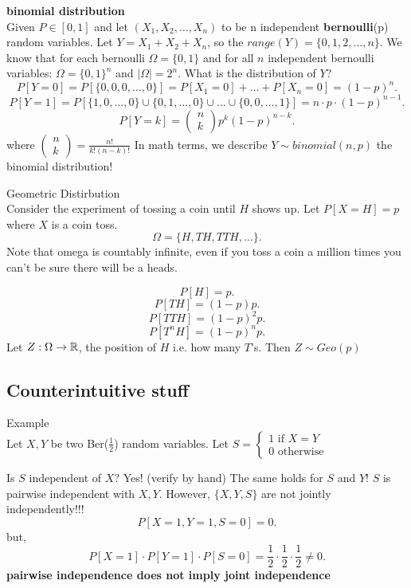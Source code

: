 \documentclass[a4paper]{article}
\begin{document}
\begin{definition}
  \textbf{binomial distribution}\\
  Given $P \in [0,1]$ and let  $\left( X_1,X_{2}, \ldots, X_{n} \right)$ to be n independent \textbf{bernoulli}(p)
  random variables. Let $Y = X_1 + X_2 + X_n$, so the $range(Y) = \{0,1,2,\ldots, n\}$. We know that for 
  each bernoulli $\Omega = \{0,1\} $ and for all $n$ independent bernoulli variables:  $\Omega = \{0,1\}^n$
  and $\mid \Omega \mid  = 2^n$. What is the distribution of $Y$?
   \[
     P[Y=0] = P[\{0,0,0,\ldots,0\}] = P[X_1 = 0] + \ldots + P[X_n = 0] = \left( 1-p \right)^n  
  .\] 
  \[
    P[Y=1] = P[\{1,0,\ldots,0\} \cup \{0,1,\ldots,0\} \cup \ldots \cup \{0,0,\ldots,1\}] = 
    n \cdot p \cdot (1-p)^{n-1}
  .\]
  \[
    P[Y=k] = \begin{pmatrix} n \\ k \end{pmatrix} p^k (1-p)^{n-k} 
  .\] 
  where $\begin{pmatrix} n \\ k \end{pmatrix} = \frac{n!}{k! (n-k)!}$ 
  In math terms, we describe $Y \sim binomial(n,p)$ the binomial distribution!
\end{definition}

\begin{definition}{Geometric Distirbution} \\
  Consider the experiment of tossing a coin until $H$ shows up. Let $P[X=H] = p$ where $X$ is a coin toss.
  \[
  \Omega = \{H, TH, TTH, \ldots\} 
  .\] 
  Note that omega is countably infinite, even if you toss a coin a million times you can't be sure there
  will be a heads.

  \[
    P[H] = p
  .\]
  \[
    P[TH] = (1-p)p
  .\] 
  \[
    P[TTH] = (1-p)^2p
  .\] 
  \[
   P[T^n H] = (1-p)^n p
  .\] 
  Let $Z: \Omega \to \mathbb{R}$, the position of $H$ i.e. how many $T$'s. Then  $Z \sim Geo(p)$
\end{definition}


\subsection{Counterintuitive stuff}
\begin{note}{Example}\\
  Let $X,Y$ be two Ber($\frac{1}{2}$) random variables. Let $S= \begin{cases}
    1 \text{ if $X=Y$} \\
    0 \text{ otherwise}
  \end{cases}$ 

  Is $S$ independent of  $X$? Yes! (verify by hand) The same holds for  $S$ and  $Y$!  $S$ is pairwise independent with  $X,Y$.
  However,  $\{X,Y,S\}$ are not jointly independently!!!
  \[
    P[X=1,Y=1,S=0] = 0
  .\] 
  but,
  \[
    P[X=1] \cdot P[Y=1] \cdot P[S=0] = \frac{1}{2} \cdot \frac{1}{2} \cdot \frac{1}{2} \neq 0
  .\] 
  \textbf{pairwise independence does not imply joint independence}
\end{note}
\end{document}
